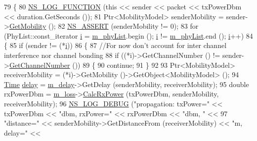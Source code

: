 \begin{DoxyCode}
79 \{
80   \hyperlink{log-macros-disabled_8h_a90b90d5bad1f39cb1b64923ea94c0761}{NS\_LOG\_FUNCTION} (\textcolor{keyword}{this} << sender << packet << txPowerDbm << duration.GetSeconds ());
81   Ptr<MobilityModel> senderMobility = sender->\hyperlink{classns3_1_1WifiPhy_abc912611b5b88566239a85b885a05430}{GetMobility} ();
82   \hyperlink{assert_8h_a6dccdb0de9b252f60088ce281c49d052}{NS\_ASSERT} (senderMobility != 0);
83   \textcolor{keywordflow}{for} (PhyList::const\_iterator \hyperlink{bernuolliDistribution_8m_a6f6ccfcf58b31cb6412107d9d5281426}{i} = \hyperlink{classns3_1_1YansWifiChannel_a6a5b45c318c8039e4bb6846b0a58c2e3}{m\_phyList}.begin (); \hyperlink{bernuolliDistribution_8m_a6f6ccfcf58b31cb6412107d9d5281426}{i} != \hyperlink{classns3_1_1YansWifiChannel_a6a5b45c318c8039e4bb6846b0a58c2e3}{m\_phyList}.end (); 
      \hyperlink{bernuolliDistribution_8m_a6f6ccfcf58b31cb6412107d9d5281426}{i}++)
84     \{
85       \textcolor{keywordflow}{if} (sender != (*\hyperlink{bernuolliDistribution_8m_a6f6ccfcf58b31cb6412107d9d5281426}{i}))
86         \{
87           \textcolor{comment}{//For now don't account for inter channel interference nor channel bonding}
88           \textcolor{keywordflow}{if} ((*i)->GetChannelNumber () != sender->\hyperlink{classns3_1_1WifiPhy_a5cf0ccf06109ace61db51c83e91b7e8d}{GetChannelNumber} ())
89             \{
90               \textcolor{keywordflow}{continue};
91             \}
92 
93           Ptr<MobilityModel> receiverMobility = (*i)->GetMobility ()->GetObject<MobilityModel> ();
94           \hyperlink{namespacens3_1_1TracedValueCallback_a7ffd3e7c142ffe7c8a1d2db9b8de38ec}{Time} \hyperlink{lte_2model_2fading-traces_2fading__trace__generator_8m_a7964e6aa8f61a9d28973c8267a606ad8}{delay} = \hyperlink{classns3_1_1YansWifiChannel_a3abdf11e233502f00d96239c50f1409e}{m\_delay}->GetDelay (senderMobility, receiverMobility);
95           \textcolor{keywordtype}{double} rxPowerDbm = \hyperlink{classns3_1_1YansWifiChannel_a7ac546c96799f5b8e02179a67d074eef}{m\_loss}->\hyperlink{classns3_1_1PropagationLossModel_a8b42564e9b03e2197f17aab6692c4fee}{CalcRxPower} (txPowerDbm, senderMobility, 
      receiverMobility);
96           \hyperlink{group__logging_ga413f1886406d49f59a6a0a89b77b4d0a}{NS\_LOG\_DEBUG} (\textcolor{stringliteral}{"propagation: txPower="} << txPowerDbm << \textcolor{stringliteral}{"dbm, rxPower="} << rxPowerDbm 
      << \textcolor{stringliteral}{"dbm, "} <<
97                         \textcolor{stringliteral}{"distance="} << senderMobility->GetDistanceFrom (receiverMobility) << \textcolor{stringliteral}{"m, delay="} <<

\end{DoxyCode}
